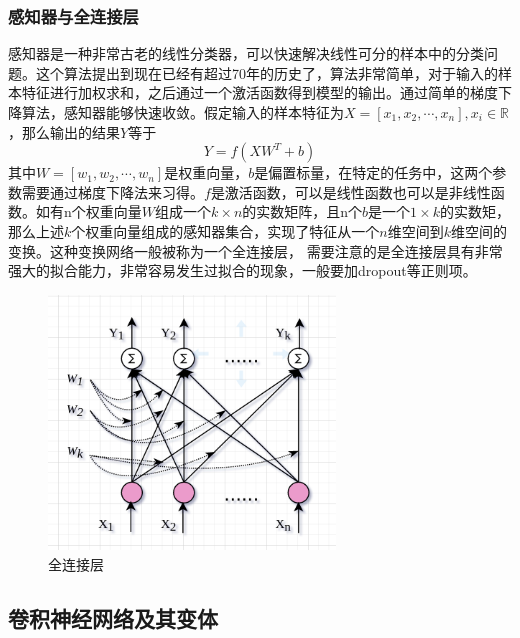 \documentclass[twoside,a4paper,12pt]{book}%
\begin{document}
\subsubsection{感知器与全连接层}
感知器是一种非常古老的线性分类器，可以快速解决线性可分的样本中的分类问题。这个算法提出到现在已经有超过70年的历史了，算法非常简单，对于输入的样本特征进行加权求和，之后通过一个激活函数得到模型的输出。通过简单的梯度下降算法，感知器能够快速收敛。假定输入的样本特征为$X=[x_1,x_2,\cdots,x_n],x_i\in \mathbb{R}$，那么输出的结果$Y$等于
$$
Y=f(XW^T+b)
$$
其中$W=[w_1,w_2,\cdots,w_n]$是权重向量，$b$是偏置标量，在特定的任务中，这两个参数需要通过梯度下降法来习得。$f$是激活函数，可以是线性函数也可以是非线性函数。如有n个权重向量$W$组成一个$k\times n$的实数矩阵，且n个$b$是一个$1\times k$的实数矩，那么上述$k$个权重向量组成的感知器集合，实现了特征从一个$n$维空间到$k$维空间的变换。这种变换网络一般被称为一个全连接层，
需要注意的是全连接层具有非常强大的拟合能力，非常容易发生过拟合的现象，一般要加dropout等正则项。
\begin{figure}[htbp]
\begin{center}
\includegraphics[width=3.0in]{figures/perception.png}
\caption{全连接层}
\label{fig:perception}
\end{center}
\end{figure}

\subsection{卷积神经网络及其变体}
\end{document}
